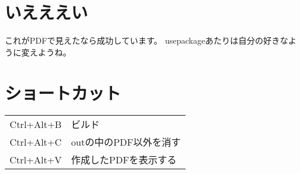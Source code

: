 \documentclass[a4j,dvipdfmx]{jsarticle}
\begin{document}
\section{いえええい}
これがPDFで見えたなら成功しています。
usepackageあたりは自分の好きなように変えようね。

\section{ショートカット}
\begin{table}[H]
  \begin{tabular}{cl}
    Ctrl+Alt+B&ビルド\\
    Ctrl+Alt+C&outの中のPDF以外を消す\\
    Ctrl+Alt+V&作成したPDFを表示する
  \end{tabular}
\end{table}
\end{document}
